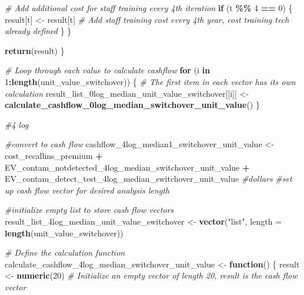 \documentclass[
]{article}
\newenvironment{Shaded}{\begin{snugshade}}{\end{snugshade}}
\newcommand{\AttributeTok}[1]{\textcolor[rgb]{0.13,0.29,0.53}{#1}}
\newcommand{\CommentTok}[1]{\textcolor[rgb]{0.56,0.35,0.01}{\textit{#1}}}
\newcommand{\ControlFlowTok}[1]{\textcolor[rgb]{0.13,0.29,0.53}{\textbf{#1}}}
\newcommand{\DecValTok}[1]{\textcolor[rgb]{0.00,0.00,0.81}{#1}}
\newcommand{\FunctionTok}[1]{\textcolor[rgb]{0.13,0.29,0.53}{\textbf{#1}}}
\newcommand{\NormalTok}[1]{#1}
\newcommand{\OtherTok}[1]{\textcolor[rgb]{0.56,0.35,0.01}{#1}}
\newcommand{\SpecialCharTok}[1]{\textcolor[rgb]{0.81,0.36,0.00}{\textbf{#1}}}
\newcommand{\StringTok}[1]{\textcolor[rgb]{0.31,0.60,0.02}{#1}}
\begin{document}
\begin{Shaded}
\begin{Highlighting}[]
    \CommentTok{\# Add additional cost for staff training every 4th iteration}
    \ControlFlowTok{if}\NormalTok{ (t }\SpecialCharTok{\%\%} \DecValTok{4} \SpecialCharTok{==} \DecValTok{0}\NormalTok{) \{}
\NormalTok{      result[t] }\OtherTok{\textless{}{-}}\NormalTok{ result[t]  }\CommentTok{\# Add staff training cost every 4th year, cost training tech already defined}
\NormalTok{    \}}
\NormalTok{  \}}
  
  \FunctionTok{return}\NormalTok{(result)}
\NormalTok{\}}

\CommentTok{\# Loop through each value to calculate cashflow}
\ControlFlowTok{for}\NormalTok{ (i }\ControlFlowTok{in} \DecValTok{1}\SpecialCharTok{:}\FunctionTok{length}\NormalTok{(unit\_value\_switchover)) \{}
  \CommentTok{\# The first item in each vector has its own calculation}
\NormalTok{  result\_list\_0log\_median\_unit\_value\_switchover[[i]] }\OtherTok{\textless{}{-}} \FunctionTok{calculate\_cashflow\_0log\_median\_switchover\_unit\_value}\NormalTok{()}
\NormalTok{\}}


\CommentTok{\#4 log}

\CommentTok{\#convert to cash flow}
\NormalTok{cashflow\_4log\_median1\_switchover\_unit\_value }\OtherTok{\textless{}{-}}\NormalTok{ cost\_recallins\_premium }\SpecialCharTok{+}\NormalTok{ EV\_contam\_notdetected\_4log\_median\_switchover\_unit\_value }\SpecialCharTok{+}\NormalTok{ EV\_contam\_detect\_test\_4log\_median\_switchover\_unit\_value }\CommentTok{\#dollars}
\CommentTok{\#set up cash flow vector for desired analysis length}


\CommentTok{\#initialize empty list to store cash flow vectors}
\NormalTok{result\_list\_4log\_median\_unit\_value\_switchover }\OtherTok{\textless{}{-}} \FunctionTok{vector}\NormalTok{(}\StringTok{"list"}\NormalTok{, }\AttributeTok{length =} \FunctionTok{length}\NormalTok{(unit\_value\_switchover))}


\CommentTok{\# Define the calculation function}
\NormalTok{calculate\_cashflow\_4log\_median\_switchover\_unit\_value }\OtherTok{\textless{}{-}} \ControlFlowTok{function}\NormalTok{() \{}
\NormalTok{  result }\OtherTok{\textless{}{-}} \FunctionTok{numeric}\NormalTok{(}\DecValTok{20}\NormalTok{)  }\CommentTok{\# Initialize an empty vector of length 20, result is the cash flow vector}
  

\end{Highlighting}
\end{Shaded}
\end{document}
